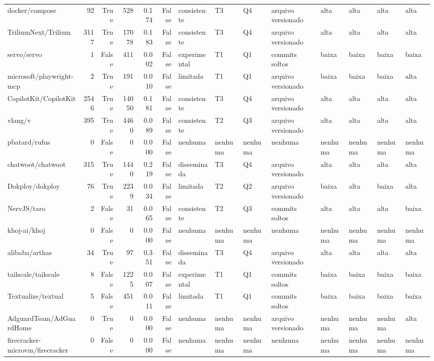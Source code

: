 \begin{tabular}{lrrrrrllllllll}
docker/compose & 92 & True & 528 & 0.174 & False & consistente & T3 & Q4 & arquivo versionado & alta & alta & alta & alta \\
TriliumNext/Trilium & 3117 & True & 17078 & 0.183 & False & consistente & T3 & Q4 & arquivo versionado & alta & alta & alta & alta \\
servo/servo & 1 & False & 411 & 0.002 & False & experimental & T1 & Q1 & commits soltos & baixa & baixa & baixa & baixa \\
microsoft/playwright-mcp & 2 & True & 191 & 0.010 & False & limitada & T1 & Q1 & arquivo versionado & baixa & baixa & baixa & alta \\
CopilotKit/CopilotKit & 2546 & True & 14050 & 0.181 & False & consistente & T3 & Q4 & arquivo versionado & alta & alta & alta & alta \\
vlang/v & 395 & True & 4460 & 0.089 & False & consistente & T2 & Q3 & arquivo versionado & alta & alta & alta & alta \\
pbatard/rufus & 0 & False & 0 & 0.000 & False & nenhuma & nenhuma & nenhuma & nenhuma & nenhuma & nenhuma & nenhuma & nenhuma \\
chatwoot/chatwoot & 315 & True & 1440 & 0.219 & False & disseminada & T3 & Q4 & arquivo versionado & alta & alta & alta & alta \\
Dokploy/dokploy & 76 & True & 2239 & 0.034 & False & limitada & T2 & Q2 & arquivo versionado & baixa & alta & baixa & alta \\
NervJS/taro & 2 & False & 31 & 0.065 & False & consistente & T2 & Q3 & commits soltos & alta & alta & alta & baixa \\
khoj-ai/khoj & 0 & False & 0 & 0.000 & False & nenhuma & nenhuma & nenhuma & nenhuma & nenhuma & nenhuma & nenhuma & nenhuma \\
alibaba/arthas & 34 & True & 97 & 0.351 & False & disseminada & T3 & Q4 & arquivo versionado & alta & alta & alta & alta \\
tailscale/tailscale & 8 & False & 1225 & 0.007 & False & experimental & T1 & Q1 & commits soltos & baixa & baixa & baixa & baixa \\
Textualize/textual & 5 & False & 451 & 0.011 & False & limitada & T1 & Q1 & commits soltos & baixa & baixa & baixa & baixa \\
AdguardTeam/AdGuardHome & 0 & True & 0 & 0.000 & False & nenhuma & nenhuma & nenhuma & arquivo versionado & nenhuma & nenhuma & nenhuma & alta \\
firecracker-microvm/firecracker & 0 & False & 0 & 0.000 & False & nenhuma & nenhuma & nenhuma & nenhuma & nenhuma & nenhuma & nenhuma & nenhuma \\

\end{tabular}
